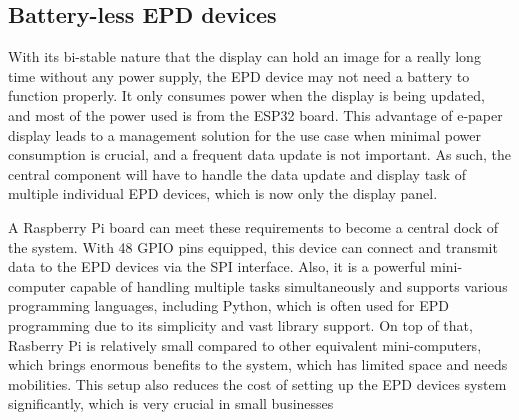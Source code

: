 \documentclass[../Main.tex]{subfiles}
\begin{document}
\begin{center}
    {\fontsize{7pt}{8pt}\selectfont 
    }
\end{center}

\subsection{Battery-less \gls{EPD} devices}
With its bi-stable nature that the display can hold an image for a really long time without any power supply, the \gls{EPD} device may not need a battery to function properly. It only consumes power when the display is being updated, and most of the power used is from the ESP32 board. This advantage of e-paper display leads to a management solution for the use case when minimal power consumption is crucial, and a frequent data update is not important. As such, the central component will have to handle the data update and display task of multiple individual \gls{EPD} devices, which is now only the display panel.

A Raspberry Pi board can meet these requirements to become a central dock of the system. With 48 GPIO pins equipped, this device can connect and transmit data to the \gls{EPD} devices via the SPI interface. Also, it is a powerful mini-computer capable of handling multiple tasks simultaneously and supports various programming languages, including Python, which is often used for \gls{EPD} programming due to its simplicity and vast library support. On top of that, Rasberry Pi is relatively small compared to other equivalent mini-computers, which brings enormous benefits to the system, which has limited space and needs mobilities. This setup also reduces the cost of setting up the \gls{EPD} devices system significantly, which is very crucial in small businesses
\end{document}
